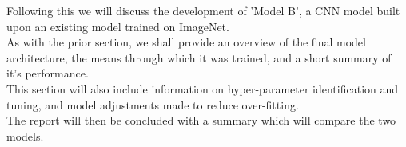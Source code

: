Following this we will discuss the development of 'Model B', a CNN model built upon an existing model trained on ImageNet.\\
As with the prior section, we shall provide an overview of the final model architecture, the means through which it was trained, and a short summary of it's performance.\\
This section will also include information on hyper-parameter identification and tuning, and model adjustments made to reduce over-fitting.\\

The report will then be concluded with a summary which will compare the two models.
